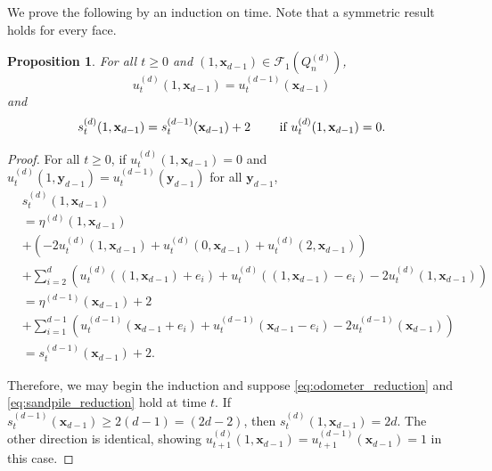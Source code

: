 \documentclass[aap]{imsart}
\newtheorem{prop}{Proposition}[section]
\begin{document}
We prove the following by an induction on time. Note that a symmetric result holds for every face. 
\begin{prop} \label{prop:dimensional_reduction}
	For all $t \geq 0$ and $(1, \mathbf{x}_{d-1}) \in \mathcal{F}_1(Q_n^{(d)})$, 
	\begin{equation} \label{eq:odometer_reduction}
	u_t^{(d)}(1,\mathbf{x}_{d-1}) = u_t^{(d-1)}(\mathbf{x}_{d-1})
	\end{equation}
	and
	\begin{equation} \label{eq:sandpile_reduction}
	s_t^{(d)}(1,\mathbf{x}_{d-1}) = s_t^{(d-1)}(\mathbf{x}_{d-1}) + 2 \qquad \mbox{ if $ u_t^{(d)}(1,\mathbf{x}_{d-1}) = 0 $}.
	\end{equation}
\end{prop}

\begin{proof}
	For all $t \geq 0$, if  $u_{t}^{(d)}(1,\mathbf{x}_{d-1}) = 0$ and $u_t^{(d)}(1,\mathbf{y}_{d-1}) = u_t^{(d-1)}(\mathbf{y}_{d-1})$ for all $\mathbf{y}_{d-1}$, 
	\begin{align*}
	&s_{t}^{(d)}(1, \mathbf{x}_{d-1}) \\
	&=  \eta^{(d)}(1, \mathbf{x}_{d-1})  \\
	&+ \left( -2 u_{t}^{(d)}(1, \mathbf{x}_{d-1}) + u_{t}^{(d)}(0, \mathbf{x}_{d-1}) + u_{t}^{(d)}(2, \mathbf{x}_{d-1}) \right) \\
	&+ \sum_{i=2}^d \left( u_{t}^{(d)}((1,\mathbf{x}_{d-1}) + e_i) + u_{t}^{(d)}((1,\mathbf{x}_{d-1})-e_i) - 2 u_{t}^{(d)}(1,\mathbf{x}_{d-1}) \right) \\
	&= \eta^{(d-1)}(\mathbf{x}_{d-1}) + 2 \\
	&+  \sum_{i=1}^{d-1} \left( u_{t}^{(d-1)}(\mathbf{x}_{d-1} + e_i) + u_{t}^{(d-1)}(\mathbf{x}_{d-1}-e_i) - 2 u_{t}^{(d-1)}(\mathbf{x}_{d-1}) \right) \\
	&=s_{t}^{(d-1)}(\mathbf{x}_{d-1})+2.
	\end{align*}
	
	Therefore, we may begin the induction and suppose \eqref{eq:odometer_reduction} and \eqref{eq:sandpile_reduction} hold at time $t$.
	If $s_t^{(d-1)}(\mathbf{x}_{d-1}) \geq 2  (d - 1) = (2 d - 2)$, then 
	$s_t^{(d)}(1,\mathbf{x}_{d-1}) = 2 d$. The other direction is identical, showing $u_{t+1}^{(d)}(1, \mathbf{x}_{d-1}) = u_{t+1}^{(d-1)}(\mathbf{x}_{d-1}) = 1$ in this case. 
	
\end{proof}
\end{document}
